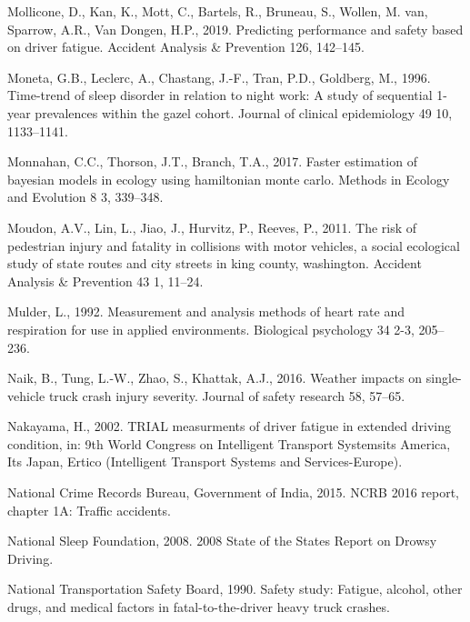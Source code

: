 \documentclass[12pt]{book}
\numberwithin{equation}{chapter}
\begin{document}
\leavevmode\hypertarget{ref-mollicone2019predicting}{}%
Mollicone, D., Kan, K., Mott, C., Bartels, R., Bruneau, S., Wollen, M. van, Sparrow, A.R., Van Dongen, H.P., 2019. Predicting performance and safety based on driver fatigue. Accident Analysis \& Prevention 126, 142--145.

\leavevmode\hypertarget{ref-moneta1996time}{}%
Moneta, G.B., Leclerc, A., Chastang, J.-F., Tran, P.D., Goldberg, M., 1996. Time-trend of sleep disorder in relation to night work: A study of sequential 1-year prevalences within the gazel cohort. Journal of clinical epidemiology 49 10, 1133--1141.

\leavevmode\hypertarget{ref-monnahan2017faster}{}%
Monnahan, C.C., Thorson, J.T., Branch, T.A., 2017. Faster estimation of bayesian models in ecology using hamiltonian monte carlo. Methods in Ecology and Evolution 8 3, 339--348.

\leavevmode\hypertarget{ref-moudon2011risk}{}%
Moudon, A.V., Lin, L., Jiao, J., Hurvitz, P., Reeves, P., 2011. The risk of pedestrian injury and fatality in collisions with motor vehicles, a social ecological study of state routes and city streets in king county, washington. Accident Analysis \& Prevention 43 1, 11--24.

\leavevmode\hypertarget{ref-mulder1992measurement}{}%
Mulder, L., 1992. Measurement and analysis methods of heart rate and respiration for use in applied environments. Biological psychology 34 2-3, 205--236.

\leavevmode\hypertarget{ref-naik2016weather}{}%
Naik, B., Tung, L.-W., Zhao, S., Khattak, A.J., 2016. Weather impacts on single-vehicle truck crash injury severity. Journal of safety research 58, 57--65.

\leavevmode\hypertarget{ref-nakayama2002trial}{}%
Nakayama, H., 2002. TRIAL measurments of driver fatigue in extended driving condition, in: 9th World Congress on Intelligent Transport Systemsits America, Its Japan, Ertico (Intelligent Transport Systems and Services-Europe).

\leavevmode\hypertarget{ref-india2015}{}%
National Crime Records Bureau, Government of India, 2015. NCRB 2016 report, chapter 1A: Traffic accidents.

\leavevmode\hypertarget{ref-nsleepf}{}%
National Sleep Foundation, 2008. 2008 State of the States Report on Drowsy Driving.

\leavevmode\hypertarget{ref-ntsb1990}{}%
National Transportation Safety Board, 1990. Safety study: Fatigue, alcohol, other drugs, and medical factors in fatal-to-the-driver heavy truck crashes.
\end{document}
